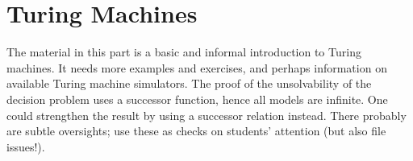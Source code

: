 \documentclass[../../include/open-logic-part]{subfiles}
\begin{document}
\part{Turing Machines}

\begin{editorial}
The material in this part is a basic and informal introduction to
Turing machines. It needs more examples and exercises, and perhaps
information on available Turing machine simulators. The proof of the
unsolvability of the decision problem uses a successor function, hence
all models are infinite.  One could strengthen the result by using a
successor relation instead. There probably are subtle oversights; use
these as checks on students' attention (but also file issues!).
\end{editorial}



\OLEndPartHook
\end{document}
